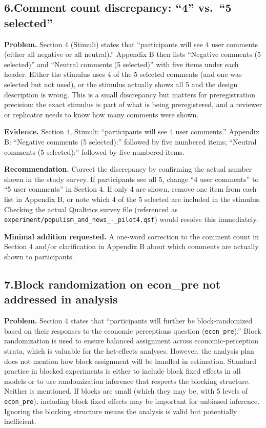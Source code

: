 \documentclass[11pt]{article}
\begin{document}
\bigskip

\subsection*{6.\enspace Comment count discrepancy: ``4'' vs.\ ``5 selected''}

\textbf{Problem.} Section 4 (Stimuli) states that ``participants will see 4 user comments (either all negative or all neutral).'' Appendix B then lists ``Negative comments (5 selected)'' and ``Neutral comments (5 selected)'' with five items under each header. Either the stimulus uses 4 of the 5 selected comments (and one was selected but not used), or the stimulus actually shows all 5 and the design description is wrong. This is a small discrepancy but matters for preregistration precision: the exact stimulus is part of what is being preregistered, and a reviewer or replicator needs to know how many comments were shown.

\textbf{Evidence.} Section 4, Stimuli: ``participants will see 4 user comments.'' Appendix B: ``Negative comments (5 selected):'' followed by five numbered items; ``Neutral comments (5 selected):'' followed by five numbered items.

\textbf{Recommendation.} Correct the discrepancy by confirming the actual number shown in the study survey. If participants see all 5, change ``4 user comments'' to ``5 user comments'' in Section 4. If only 4 are shown, remove one item from each list in Appendix B, or note which 4 of the 5 selected are included in the stimulus. Checking the actual Qualtrics survey file (referenced as \texttt{experiment/populism\_and\_news\_-\_pilot4.qsf}) would resolve this immediately.

\textbf{Minimal addition requested.} A one-word correction to the comment count in Section 4 and/or clarification in Appendix B about which comments are actually shown to participants.

\bigskip

\subsection*{7.\enspace Block randomization on econ\_pre not addressed in analysis}

\textbf{Problem.} Section 4 states that ``participants will further be block-randomized based on their responses to the economic perceptions question (\texttt{econ\_pre}).'' Block randomization is used to ensure balanced assignment across economic-perception strata, which is valuable for the het-effects analyses. However, the analysis plan does not mention how block assignment will be handled in estimation. Standard practice in blocked experiments is either to include block fixed effects in all models or to use randomization inference that respects the blocking structure. Neither is mentioned. If blocks are small (which they may be, with 5 levels of \texttt{econ\_pre}), including block fixed effects may be important for unbiased inference. Ignoring the blocking structure means the analysis is valid but potentially inefficient.
\end{document}
